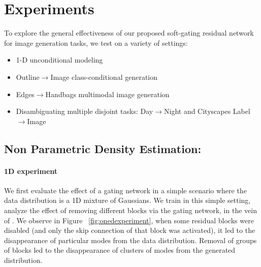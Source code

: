 \section{Experiments}

\noindent To explore the general effectiveness of our proposed soft-gating residual network for image generation tasks, we test on a variety of settings:


\begin{itemize}[noitemsep]
\item {1-D unconditional modeling}
\item {Outline$\rightarrow$Image class-conditional generation}
\item {Edges$\rightarrow$Handbags multimodal image generation}
\item {Disambiguating multiple disjoint tasks: Day$\rightarrow$Night and Cityscapes Label$\rightarrow$Image}
\end{itemize}

\subsection{Non Parametric Density Estimation:}

\paragraph{1D experiment}
We first evaluate the effect of a gating network in a simple scenario where the data distribution is a 1D mixture of Gaussians. 
We train \model{} in this simple setting, analyze the effect of removing different blocks via the gating network, in the vein of \cite{veit2016residual}.
We observe in Figure ~\ref{fig:onedexperiment}, when some residual blocks were disabled (and only the skip connection of that block was activated), it led to the disappearance of particular modes from the data distribution. 
Removal of groups of blocks led to the disappearance of clusters of modes from the generated distribution. 

